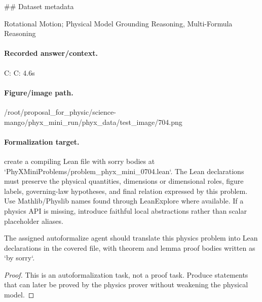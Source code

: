 \#\# Dataset metadata

Rotational Motion; Physical Model Grounding Reasoning, Multi-Formula Reasoning

\paragraph{Recorded answer/context.}
C: C: 4.6s

\paragraph{Figure/image path.}
/root/proposal\_for\_physic/science-mango/phyx\_mini\_run/phyx\_data/test\_image/704.png

\paragraph{Formalization target.}
create a compiling Lean file with sorry bodies at `PhyXMiniProblems/problem\_phyx\_mini\_0704.lean`. The Lean declarations must preserve the physical quantities, dimensions or dimensional roles, figure labels, governing-law hypotheses, and final relation expressed by this problem.
Use Mathlib/Physlib names found through LeanExplore where available. If a physics API is missing, introduce faithful local abstractions rather than scalar placeholder aliases.

\begin{theorem}
\label{thm:physics:phyx_mini_0704:target}
The assigned autoformalize agent should translate this physics problem into Lean declarations in the covered file, with theorem and lemma proof bodies written as `by sorry`.
\end{theorem}
\begin{proof}
This is an autoformalization task, not a proof task. Produce statements that can later be proved by the physics prover without weakening the physical model.
\end{proof}

